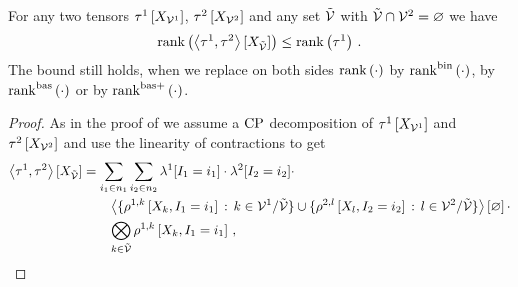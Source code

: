 \begin{lemma}
    \label{lem:sparsityDisjointContraction}
    For any two tensors $\tau^{1}\left[X_{\mathcal{V}^{1}}\right]$, $\tau^{2}\left[X_{\mathcal{V}^{2}}\right]$ and any set $\tilde{\mathcal{V}}$ with $\tilde{\mathcal{V}}\cap\mathcal{V}^{2}=\varnothing$ we have
    \begin{align*}
        \mathrm{rank}\left(\left\langle \tau^{1},\tau^{2}\right\rangle \left[ X_{\tilde{\mathcal{V}}} \right]\right) \leq \mathrm{rank}\left(\tau^{1}\right) \, .
    \end{align*}
    The bound still holds, when we replace on both sides $\mathrm{rank}\left(\cdot\right)$ by $\mathrm{rank}^{\mathrm{bin}}\left(\cdot\right)$, by $\mathrm{rank}^{\mathrm{bas}}\left(\cdot\right)$ or by $\mathrm{rank}^{\mathrm{bas+}}\left(\cdot\right)$.
\end{lemma}
\begin{proof}
    As in the proof of  we assume a $\mathrm{CP}$ decomposition of $\tau^{1}\left[X_{\mathcal{V}^{1}}\right]$ and $\tau^{2}\left[X_{\mathcal{V}^{2}}\right]$ and use the linearity of contractions to get
    \begin{align*}
        \left\langle \tau^{1},\tau^{2}\right\rangle \left[ X_{\tilde{\mathcal{V}}} \right]
        &= \sum_{i_{1}\in n_{1}} \sum_{i_{2}\in n_{2}}
        \lambda^{1}[I_{1}=i_{1}] \cdot \lambda^{2}[I_{2}=i_{2}] \cdot \\
        & \quad\quad \left\langle \{\rho^{1,k}\left[X_{k},I_{1}=i_{1}\right] \,:\, k\in\mathcal{V}^{1}/\tilde{\mathcal{V}}\} \cup \{\rho^{2,l}\left[X_{l},I_{2}=i_{2}\right] \,:\, l\in\mathcal{V}^{2}/\tilde{\mathcal{V}}\}\right\rangle \left[ \varnothing \right] \cdot \\
        & \quad\quad \bigotimes_{k\in\tilde{\mathcal{V}}} \rho^{1,k}\left[X_{k},I_{1}=i_{1}\right] \, ,
    \end{align*}

\end{proof}
